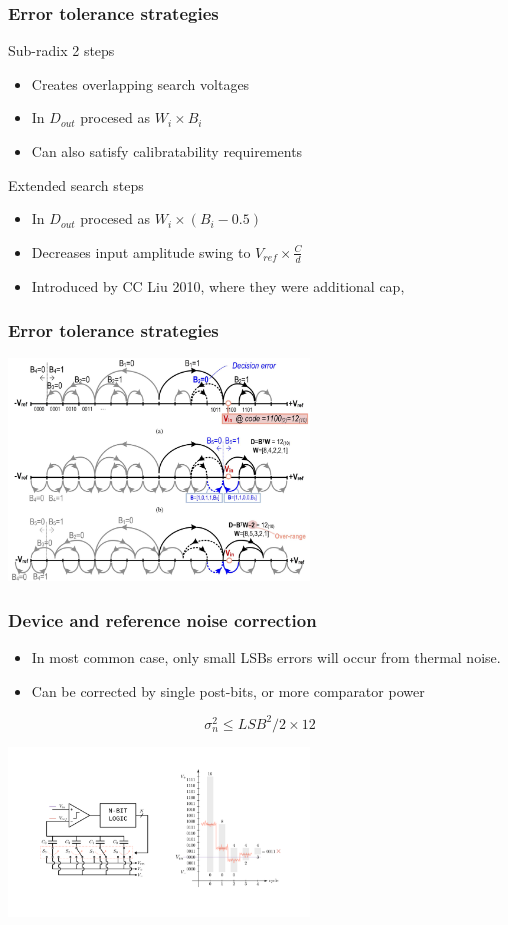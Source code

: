 \documentclass[aspectratio=169]{beamer}
\begin{document}
\begin{frame}
  \frametitle{Error tolerance strategies}
  Sub-radix 2 steps
  \begin{itemize}
    \item Creates overlapping search voltages
    \item In $D_{out}$ procesed as $W_i \times B_i$
    \item Can also satisfy calibratability requirements
  \end{itemize}
  Extended search steps
  \begin{itemize}
    \item In $D_{out}$ procesed as $W_i \times (B_i-0.5)$
    \item Decreases input amplitude swing to $V_{ref} \times \frac{C}{d}$
    \item Introduced by CC Liu 2010, where they were additional cap, 
  \end{itemize}
  \end{frame}

\begin{frame}
  \frametitle{Error tolerance strategies}
  \begin{center}
    \includegraphics[width=0.6\textwidth]{redun_strats.png}
  \end{center}
  \end{frame}


\begin{frame}
\frametitle{Device and reference noise correction}
\begin{itemize}
  \item In most common case, only small LSBs errors will occur from thermal noise.
  \item Can be corrected by single post-bits, or more comparator power
\end{itemize}
\begin{equation*}
\sigma_n^2 \leq LSB^2 / 2 \times 12
\end{equation*}
\begin{center}
\includegraphics[width=0.6\textwidth]{tranchar3.pdf}
\end{center}
\end{frame}
\end{document}

